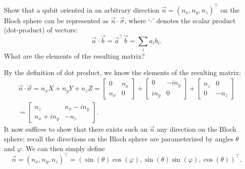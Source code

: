 \documentclass{../../../kin_math}
\begin{document}
\begin{questions}
  Show that a qubit oriented in an arbitrary direction $\vec{n} = (n_x, n_y, n_z)^\top$ on the Bloch sphere can be represented as $\vec{n} \cdot \vec{\sigma}$, where `$\cdot$' denotes the scalar product (dot-product) of vectors:
  \begin{equation*}
    \vec{a} \cdot \vec{b} = \vec{a}^\top \vec{b} = \sum_i a_i b_i.
  \end{equation*}
  What are the elements of the resulting matrix?
  \begin{solution}
    By the definition of dot product, we know the elements of the resulting matrix:
    \begin{multline*}
      \vec{n} \cdot \vec{\sigma} = n_x X + n_y Y + n_z Z = \begin{bmatrix} 0 & n_x \\ n_x & 0 \end{bmatrix} + \begin{bmatrix} 0 & -in_y \\ in_y & 0 \end{bmatrix} + \begin{bmatrix} n_z & 0 \\ 0 & -n_z \end{bmatrix} \\
      = \begin{bmatrix} n_z & n_x - in_y \\ n_x + in_y & -n_z \end{bmatrix}.
    \end{multline*}
    It now suffices to show that there exists such an $\vec{n}$ any direction on the Bloch sphere; recall the directions on the Bloch sphere are parameterized by angles $\theta$ and $\varphi$. We can then simply define
    \begin{equation*}
      \vec{n} = (n_x, n_y, n_z)^\top = (\sin(\theta)\cos(\varphi), \sin(\theta)\sin(\varphi), \cos(\theta))^\top.
    \end{equation*}
  \end{solution}


\end{questions}
\end{document}
